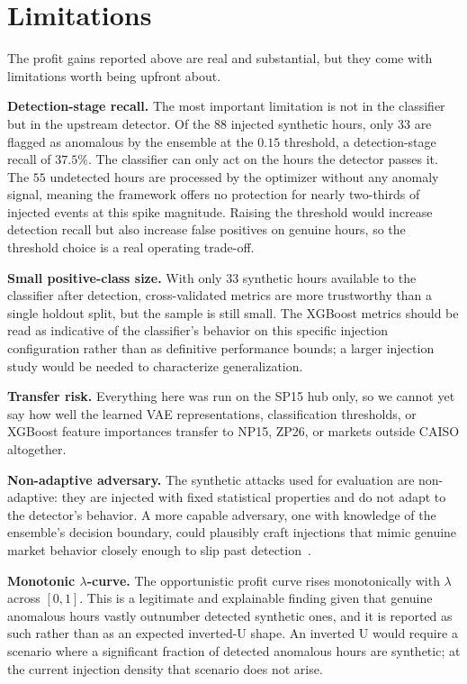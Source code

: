 \documentclass[journal]{IEEEtran}
\begin{document}
\section{Limitations}

The profit gains reported above are real and substantial, but they come with limitations worth being upfront about.

\textbf{Detection-stage recall.} The most important limitation is not in the classifier but in the upstream detector. Of the 88 injected synthetic hours, only 33 are flagged as anomalous by the ensemble at the $0.15$ threshold, a detection-stage recall of $37.5\%$. The classifier can only act on the hours the detector passes it. The $55$ undetected hours are processed by the optimizer without any anomaly signal, meaning the framework offers no protection for nearly two-thirds of injected events at this spike magnitude. Raising the threshold would increase detection recall but also increase false positives on genuine hours, so the threshold choice is a real operating trade-off.

\textbf{Small positive-class size.} With only 33 synthetic hours available to the classifier after detection, cross-validated metrics are more trustworthy than a single holdout split, but the sample is still small. The XGBoost metrics should be read as indicative of the classifier's behavior on this specific injection configuration rather than as definitive performance bounds; a larger injection study would be needed to characterize generalization.

\textbf{Transfer risk.} Everything here was run on the SP15 hub only, so we cannot yet say how well the learned VAE representations, classification thresholds, or XGBoost feature importances transfer to NP15, ZP26, or markets outside CAISO altogether.

\textbf{Non-adaptive adversary.} The synthetic attacks used for evaluation are non-adaptive: they are injected with fixed statistical properties and do not adapt to the detector's behavior. A more capable adversary, one with knowledge of the ensemble's decision boundary, could plausibly craft injections that mimic genuine market behavior closely enough to slip past detection~\cite{Vulnerability_Analysis}.

\textbf{Monotonic $\lambda$-curve.} The opportunistic profit curve rises monotonically with $\lambda$ across $[0, 1]$. This is a legitimate and explainable finding given that genuine anomalous hours vastly outnumber detected synthetic ones, and it is reported as such rather than as an expected inverted-U shape. An inverted U would require a scenario where a significant fraction of detected anomalous hours are synthetic; at the current injection density that scenario does not arise.
\end{document}
